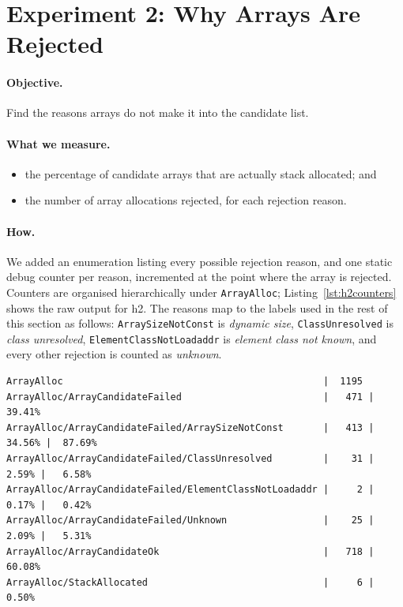 \section{Experiment 2: Why Arrays Are Rejected}

\paragraph{Objective.} Find the reasons arrays do not make it into the candidate list.

\paragraph{What we measure.}
\begin{itemize}
  \item the percentage of candidate arrays that are actually stack allocated; and
  \item the number of array allocations rejected, for each rejection reason.
\end{itemize}

\paragraph{How.} We added an enumeration listing every possible rejection reason, and one static
debug counter per reason, incremented at the point where the array is rejected. Counters are
organised hierarchically under \texttt{ArrayAlloc}; Listing~\ref{lst:h2counters} shows the raw
output for h2. The reasons map to the labels used in the rest of this section as follows:
\texttt{ArraySizeNotConst} is \emph{dynamic size}, \texttt{ClassUnresolved} is \emph{class
unresolved}, \texttt{ElementClassNotLoadaddr} is \emph{element class not known}, and every other
rejection is counted as \emph{unknown}.

\begin{lstlisting}[language={}, numbers=none, basicstyle=\ttfamily\scriptsize, caption={Static debug counters for h2.}, label={lst:h2counters}]
ArrayAlloc                                              |  1195
ArrayAlloc/ArrayCandidateFailed                         |   471 |  39.41%
ArrayAlloc/ArrayCandidateFailed/ArraySizeNotConst       |   413 |  34.56% |  87.69%
ArrayAlloc/ArrayCandidateFailed/ClassUnresolved         |    31 |   2.59% |   6.58%
ArrayAlloc/ArrayCandidateFailed/ElementClassNotLoadaddr |     2 |   0.17% |   0.42%
ArrayAlloc/ArrayCandidateFailed/Unknown                 |    25 |   2.09% |   5.31%
ArrayAlloc/ArrayCandidateOk                             |   718 |  60.08%
ArrayAlloc/StackAllocated                               |     6 |   0.50%
\end{lstlisting}

